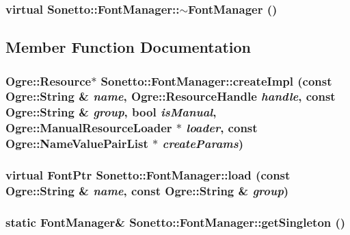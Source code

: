 \subsubsection{\setlength{\rightskip}{0pt plus 5cm}virtual Sonetto::FontManager::$\sim$FontManager ()\hspace{0.3cm}{\tt  [virtual]}}\label{class_sonetto_1_1_font_manager_8eda61cef5a0d049708683c11fd8f27e}




\subsection{Member Function Documentation}
\subsubsection{\setlength{\rightskip}{0pt plus 5cm}Ogre::Resource$\ast$ Sonetto::FontManager::createImpl (const Ogre::String \& {\em name}, Ogre::ResourceHandle {\em handle}, const Ogre::String \& {\em group}, bool {\em isManual}, Ogre::ManualResourceLoader $\ast$ {\em loader}, const Ogre::NameValuePairList $\ast$ {\em createParams})\hspace{0.3cm}{\tt  [protected]}}\label{class_sonetto_1_1_font_manager_55075b102a291659f5c874fec9d4326e}


\subsubsection{\setlength{\rightskip}{0pt plus 5cm}virtual {\bf FontPtr} Sonetto::FontManager::load (const Ogre::String \& {\em name}, const Ogre::String \& {\em group})\hspace{0.3cm}{\tt  [virtual]}}\label{class_sonetto_1_1_font_manager_cab58393109e705a065746c126e49b08}


\subsubsection{\setlength{\rightskip}{0pt plus 5cm}static {\bf FontManager}\& Sonetto::FontManager::getSingleton ()\hspace{0.3cm}{\tt  [static]}}\label{class_sonetto_1_1_font_manager_147b581d49182de5ff0bf119db0745ae}


